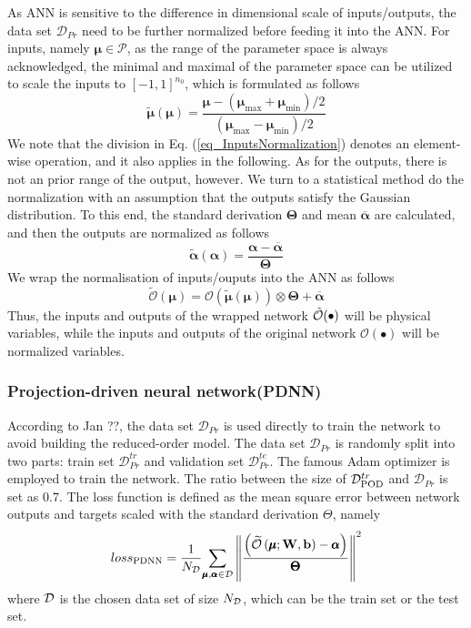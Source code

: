 \documentclass[preprint, 10pt]{elsarticle}
\begin{document}
As ANN is sensitive to the difference in dimensional scale of inputs/outputs,
the data set $\mathcal{D}_{Pr}$ need to be further normalized before feeding it into the ANN. For inputs, namely $\pmb{\mu} \in \mathcal{P}$, as the range of the parameter space is always acknowledged, the minimal and maximal of the parameter space can be utilized to scale the inputs to $[-1,1]^{n_0}$, which is formulated as follows
\begin{equation}
\tilde{\pmb{\mu}}(\pmb{\mu}) =
\frac
{{\pmb{\mu}}- ( {\pmb{\mu}}_{\max} +{\pmb{\mu}}_{\min} )/2}
{             ( {\pmb{\mu}}_{\max} -{\pmb{\mu}}_{\min} )/2}
\label{eq_InputsNormalization}
\end{equation}
We note that the division in Eq. (\ref{eq_InputsNormalization}) denotes an element-wise operation, and it also applies in the following.
As for the outputs, there is not an prior range of the output, however. We turn to a statistical method do the normalization with an assumption that the outputs satisfy the Gaussian distribution. To this end, the standard derivation $\pmb{\Theta}$ and mean $\overline {\pmb{\alpha}}$ are calculated, and then the outputs are normalized as follows
\begin{equation}
\tilde{\pmb{\alpha}}(\pmb{\alpha}) =
\frac
{{\pmb{\alpha}}- \overline {\pmb{\alpha}}}
{     \pmb{\Theta}         }
\end{equation}
We wrap the normalisation of inputs/ouputs into the ANN as follows
\begin{equation}
\tilde{\mathcal{O}}\left(\pmb{\mu}\right)
 =
{\mathcal{O}}\left(\mathbf{ \tilde{\pmb{\mu}}(\pmb{\mu}) }\right)
\otimes
\pmb{\Theta} + \overline {\pmb{\alpha}}
\end{equation}
Thus, the inputs and outputs of the wrapped network  $\tilde{\cal{O}}(\bullet)$ will be physical variables, while the inputs and outputs of the original network $\mathcal{O}(\bullet)$  will be normalized variables.

\subsubsection{Projection-driven neural network(PDNN)}
According to Jan ??, the data set $\mathcal{D}_{Pr}$ is used directly to train the network to avoid building the reduced-order model. The data set $\mathcal{D}_{Pr}$ is randomly split into two parts: train set $\mathcal{D}_{Pr}^{tr}$ and validation set $\mathcal{D}_{Pr}^{te}$. The famous Adam optimizer is employed to train the network. The ratio between the size of $\mathcal{D}_{\rm{POD}}^{tr}$ and $\mathcal{D}_{Pr}$  is set as 0.7. The loss function is defined as the mean square error between network outputs and targets scaled with the standard derivation $\Theta$, namely
\begin{equation}
loss_{\rm{PDNN}} = \frac{1}{N_{\cal D}}
{{\sum\limits_{\pmb\mu ,\pmb\alpha  \in {\cal D}} {{{\left\| {\frac{\left( {\widetilde {\cal O}\left( {\pmb\mu ;{\bf{W}},{\bf{b}}} \right) - \pmb{\alpha} } \right)} {\pmb{\Theta}} } \right\|}^2}} }}
\end{equation}
where $\cal D$ is the chosen data set of size $N_{\cal D}$, which can be the train set or the test set.
\end{document}
